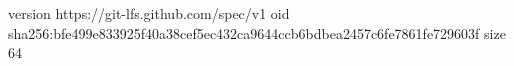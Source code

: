 version https://git-lfs.github.com/spec/v1
oid sha256:bfe499e833925f40a38cef5ec432ca9644ccb6bdbea2457c6fe7861fe729603f
size 64
